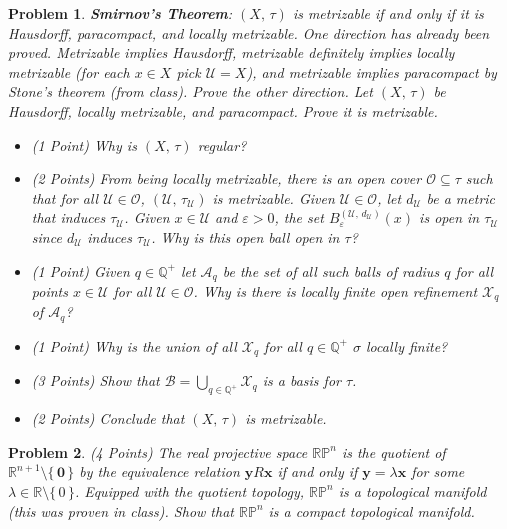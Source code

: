 \documentclass{article}
\theoremstyle{normal}
\newtheorem{problem}{Problem}
\begin{document}
\begin{problem}
        \textbf{Smirnov's Theorem}: $(X,\,\tau)$ is metrizable if and only if
        it is Hausdorff, paracompact, and locally metrizable. One direction has
        already been proved. Metrizable implies Hausdorff, metrizable definitely
        implies locally metrizable (for each $x\in{X}$ pick $\mathcal{U}=X$),
        and metrizable implies paracompact by Stone's theorem (from class).
        Prove the other direction. Let $(X,\,\tau)$ be Hausdorff, locally
        metrizable, and paracompact. Prove it is metrizable.
        \begin{itemize}
            \item (1 Point) Why is $(X,\,\tau)$ regular?
            \item (2 Points) From being locally metrizable, there is an open
                cover $\mathcal{O}\subseteq\tau$ such that for all
                $\mathcal{U}\in\mathcal{O}$,
                $(\mathcal{U},\,\tau_{\mathcal{U}})$ is metrizable. Given
                $\mathcal{U}\in\mathcal{O}$, let $d_{\mathcal{U}}$ be a metric
                that induces $\tau_{\mathcal{U}}$. Given $x\in\mathcal{U}$
                and $\varepsilon>0$, the set
                $B_{\varepsilon}^{(\mathcal{U},\,d_{\mathcal{U}})}(x)$ is open
                in $\tau_{\mathcal{U}}$ since $d_{\mathcal{U}}$ induces
                $\tau_{\mathcal{U}}$. Why is this open ball open in $\tau$?
            \item (1 Point) Given $q\in\mathbb{Q}^{+}$ let
                $\mathcal{A}_{q}$ be the set of all such balls of radius $q$
                for all points $x\in\mathcal{U}$ for all
                $\mathcal{U}\in\mathcal{O}$. Why is there is locally finite
                open refinement $\mathcal{X}_{q}$ of $\mathcal{A}_{q}$?
            \item (1 Point) Why is the union of all $\mathcal{X}_{q}$ for all
                $q\in\mathbb{Q}^{+}$ $\sigma$ locally finite?
            \item (3 Points) Show that
                $\mathcal{B}=\bigcup_{q\in\mathbb{Q}^{+}}\mathcal{X}_{q}$ is a
                basis for $\tau$.
            \item (2 Points) Conclude that $(X,\,\tau)$ is metrizable.
        \end{itemize}
    \end{problem}
    \begin{problem}
        (4 Points)
        The real projective space $\mathbb{RP}^{n}$ is the quotient of
        $\mathbb{R}^{n+1}\setminus\{\,\mathbf{0}\,\}$ by the equivalence
        relation $\mathbf{y}R\mathbf{x}$ if and only if
        $\mathbf{y}=\lambda\mathbf{x}$ for some
        $\lambda\in\mathbb{R}\setminus\{\,0\,\}$. Equipped with the quotient
        topology, $\mathbb{RP}^{n}$ is a topological manifold (this was proven
        in class). Show that $\mathbb{RP}^{n}$ is a compact
        topological manifold.
    \end{problem}
\end{document}
